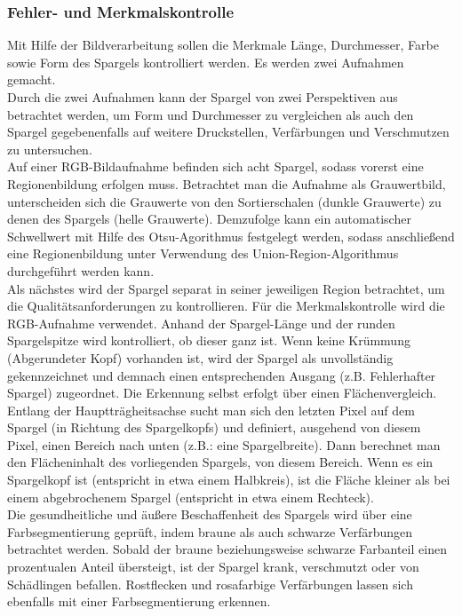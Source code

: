 \documentclass{ezb}
\begin{document}
\subsubsection*{Fehler- und Merkmalskontrolle}
Mit Hilfe der Bildverarbeitung sollen die Merkmale Länge, Durchmesser, Farbe sowie Form des Spargels kontrolliert werden. Es werden zwei Aufnahmen gemacht.\\
\linebreak
Durch die zwei Aufnahmen kann der Spargel von zwei Perspektiven aus betrachtet werden, um Form und Durchmesser zu vergleichen als auch den Spargel gegebenenfalls auf weitere Druckstellen, Verfärbungen und Verschmutzen zu untersuchen.\\
\linebreak
Auf einer RGB-Bildaufnahme befinden sich acht Spargel, sodass vorerst eine Regionenbildung erfolgen muss. Betrachtet man die Aufnahme als Grauwertbild, unterscheiden sich die Grauwerte von den Sortierschalen (dunkle Grauwerte) zu denen des Spargels (helle Grauwerte). Demzufolge kann ein automatischer Schwellwert mit Hilfe des Otsu-Agorithmus festgelegt werden, sodass anschließend eine Regionenbildung unter Verwendung des Union-Region-Algorithmus durchgeführt werden kann.\\
\linebreak 
Als nächstes wird der Spargel separat in seiner jeweiligen Region betrachtet, um die Qualitätsanforderungen zu kontrollieren. Für die Merkmalskontrolle wird die RGB-Aufnahme verwendet. Anhand der Spargel-Länge und der runden Spargelspitze wird kontrolliert, ob dieser ganz ist. Wenn keine Krümmung (Abgerundeter Kopf) vorhanden ist, wird der Spargel als unvollständig gekennzeichnet und demnach einen entsprechenden Ausgang (z.B. \glqq Fehlerhafter Spargel\grqq) zugeordnet. Die Erkennung selbst erfolgt über einen Flächenvergleich. Entlang der Hauptträgheitsachse sucht man sich den letzten Pixel auf dem Spargel (in Richtung des Spargelkopfs) und definiert, ausgehend von diesem Pixel, einen Bereich nach unten (z.B.: eine Spargelbreite). Dann berechnet man den Flächeninhalt des vorliegenden Spargels, von diesem Bereich. Wenn es ein Spargelkopf ist (entspricht in etwa einem Halbkreis), ist die Fläche kleiner als bei einem abgebrochenem Spargel (entspricht in etwa einem Rechteck).\\
\linebreak
Die gesundheitliche und äußere Beschaffenheit des Spargels wird über eine Farbsegmentierung geprüft, indem braune als auch schwarze Verfärbungen betrachtet werden. Sobald der braune beziehungsweise schwarze Farbanteil einen prozentualen Anteil übersteigt, ist der Spargel krank, verschmutzt oder von Schädlingen befallen. Rostflecken und rosafarbige Verfärbungen lassen sich ebenfalls mit einer Farbsegmentierung erkennen.\\
\end{document}
